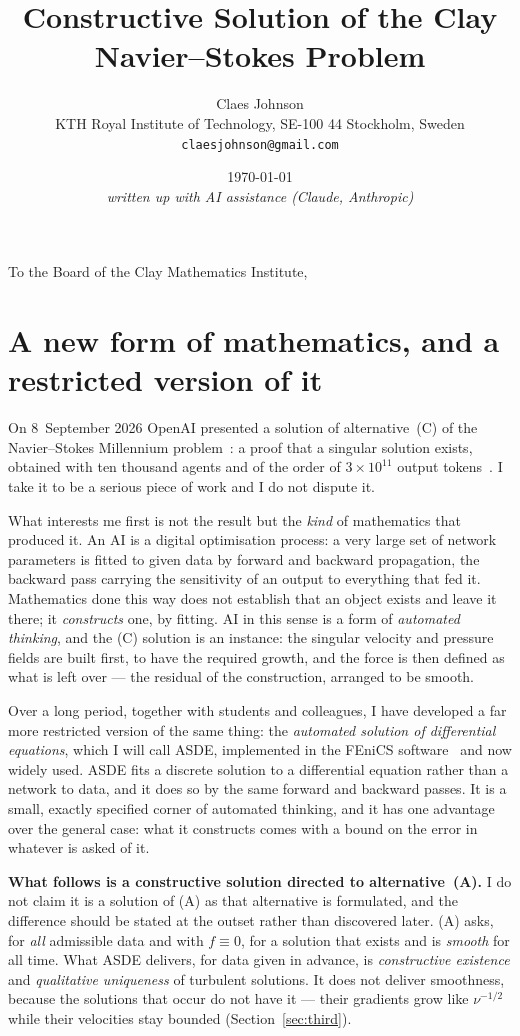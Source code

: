 \documentclass[11pt]{article}
\title{\vspace{-2em}Constructive Solution of the Clay Navier--Stokes Problem}
\author{Claes Johnson\\[0.2em]
\small KTH Royal Institute of Technology, SE-100 44 Stockholm, Sweden\\
\small \texttt{claesjohnson@gmail.com}}
\date{\today\\[0.4em]\small\textit{written up with AI assistance (Claude, Anthropic)}}
\begin{document}
\maketitle

\noindent
To the Board of the Clay Mathematics Institute,

\medskip

\section{A new form of mathematics, and a restricted version of it}

On 8~September 2026 OpenAI presented a solution of alternative~(C) of the Navier--Stokes
Millennium problem~\cite{openai}: a proof that a singular solution exists, obtained with ten
thousand agents and of the order of $3\times10^{11}$ output tokens~\cite{buckmaster}. I take it to
be a serious piece of work and I do not dispute it.

What interests me first is not the result but the \emph{kind} of mathematics that produced it. An
AI is a digital optimisation process: a very large set of network parameters is fitted to given
data by forward and backward propagation, the backward pass carrying the sensitivity of an output
to everything that fed it. Mathematics done this way does not establish that an object exists and
leave it there; it \emph{constructs} one, by fitting. AI in this sense is a form of
\emph{automated thinking}, and the (C) solution is an instance: the singular velocity and pressure
fields are built first, to have the required growth, and the force is then defined as what is left
over --- the residual of the construction, arranged to be smooth.

Over a long period, together with students and colleagues, I have developed a far more restricted
version of the same thing: the \emph{automated solution of differential equations}, which I will
call ASDE, implemented in the FEniCS software~\cite{unicorn,massparallel,fenicshpc,fenicsmulti} and
now widely used. ASDE fits a discrete solution to a differential equation rather than a network to
data, and it does so by the same forward and backward passes. It is a small, exactly specified
corner of automated thinking, and it has one advantage over the general case: what it constructs
comes with a bound on the error in whatever is asked of it.

\textbf{What follows is a constructive solution directed to alternative~(A).} I do not claim it is a
solution of (A) as that alternative is formulated, and the difference should be stated at the outset
rather than discovered later. (A) asks, for \emph{all} admissible data and with $f\equiv0$, for a
solution that exists and is \emph{smooth} for all time. What ASDE delivers, for data given in
advance, is \emph{constructive existence} and \emph{qualitative uniqueness} of turbulent solutions.
It does not deliver smoothness, because the solutions that occur do not have it --- their gradients
grow like $\nu^{-1/2}$ while their velocities stay bounded (Section~\ref{sec:third}).
\end{document}
